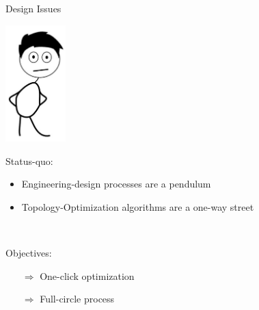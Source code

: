 \begin{frame}{Design Issues}
	
	\includegraphics[width=0.175\textwidth, center]{Pictures/animations/animation_designer_sad}
	
	\begin{multicols}{2}
		\begin{block}{Status-quo:}{
				\begin{itemize}		
					\item Engineering-design processes are a pendulum
					\item Topology-Optimization algorithms are a one-way street
				\end{itemize}~\\
			}
		\end{block}
		\pause
		\columnbreak
		
		\begin{block}{Objectives:}{
				\begin{itemize}		
					\item[$\Rightarrow$] One-click optimization
				\end{itemize}
				\begin{itemize}		
					\item[$\Rightarrow$] Full-circle process
				\end{itemize}
			}
		\end{block}
		
	\end{multicols}
	
\end{frame}	

